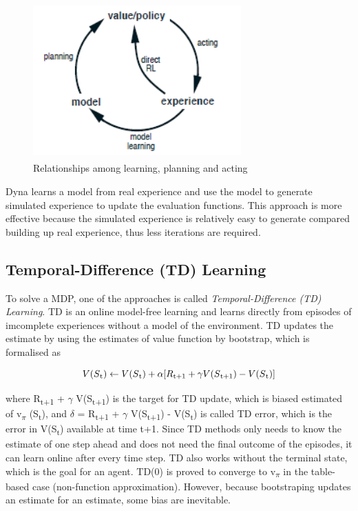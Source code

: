 \documentclass[12pt,twoside]{report}
\theoremstyle{plain}
\theoremstyle{definition}
\begin{document}
\begin{figure}[!htb]
\centering
\includegraphics[width=8cm, height=6cm]{./figures/dyna}
\caption{Relationships among learning, planning and acting}
\label{dyna}
\end{figure}

Dyna learns a model from real experience and use the model to generate simulated experience to update the evaluation functions.
This approach is more effective because the simulated experience is relatively easy to generate compared building up real experience, thus less iterations are required.

\subsection{Temporal-Difference (TD) Learning}
\label{td_learning_section}

To solve a MDP, one of the approaches is called \textit{Temporal-Difference (TD) Learning}.
TD is an online model-free learning and learns directly from episodes of imcomplete experiences without a model of the environment.
TD updates the estimate by using the estimates of value function by bootstrap, which is formalised as

\begin{equation}
\centering
V(S\textsubscript{t}) \leftarrow V(S\textsubscript{t}) + \alpha[R\textsubscript{t+1} + \gamma V(S\textsubscript{t+1}) - V(S\textsubscript{t})]
\end{equation}

where R\textsubscript{t+1} + $\gamma$ V(S\textsubscript{t+1}) is the target for TD update, which is biased estimated of v\textsubscript{$\pi$} (S\textsubscript{t}), and $\delta$ = R\textsubscript{t+1} + $\gamma$ V(S\textsubscript{t+1}) - V(S\textsubscript{t}) is called TD error, which is the error in V(S\textsubscript{t}) available at time t+1.
Since TD methods only needs to know the estimate of one step ahead and does not need the final outcome of the episodes, it can learn online after every time step. TD also works without the terminal state, which is the goal for an agent.
TD(0) is proved to converge to v\textsubscript{$\pi$} in the table-based case (non-function approximation).
However, because bootstraping updates an estimate for an estimate, some bias are inevitable.
\end{document}
